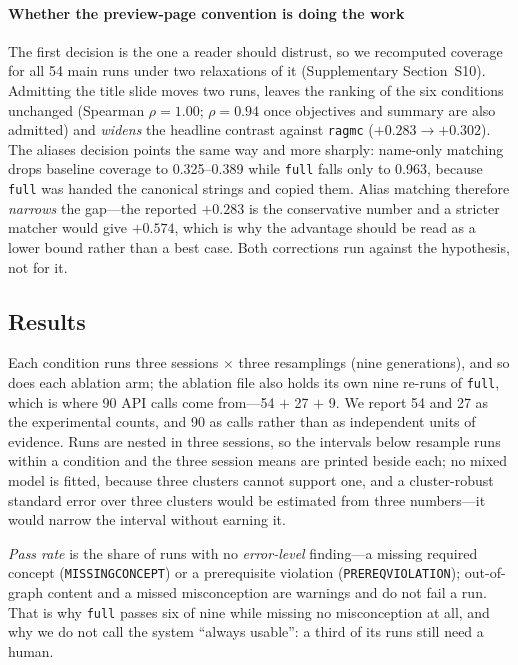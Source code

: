 \documentclass[review,12pt]{elsarticle}
\renewcommand{\_}{\kgunderscore\allowbreak}
\newcommand{\id}[1]{\texttt{#1}}
\begin{document}
\paragraph{Whether the preview-page convention is doing the work}
\label{sec:coverage-sensitivity}
The first decision is the one a reader should distrust, so we recomputed coverage
for all 54 main runs under two relaxations of it (Supplementary
Section~S10). Admitting the title slide moves two runs, leaves the ranking of
the six conditions unchanged (Spearman $\rho=1.00$; $\rho=0.94$ once objectives
and summary are also admitted) and \emph{widens} the headline contrast against
\id{rag\_mc} ($+0.283\to+0.302$). The aliases decision points the same way and
more sharply: name-only matching drops baseline coverage to 0.325--0.389 while
\id{full} falls only to 0.963, because \id{full} was handed the canonical strings
and copied them. Alias matching therefore \emph{narrows} the gap---the reported
$+0.283$ is the conservative number and a stricter matcher would give $+0.574$,
which is why the advantage should be read as a lower bound rather than a best
case. Both corrections run against the hypothesis, not for it.



\subsection{Results}
\label{sec:results}

Each condition runs three sessions $\times$ three resamplings (nine
generations), and so does each ablation arm; the ablation file also holds its own
nine re-runs of \id{full}, which is where 90 API calls come from---54 $+$ 27 $+$
9. We report 54 and 27 as the experimental counts, and 90 as calls rather than as
independent units of evidence. Runs are nested in three sessions, so the
intervals below resample runs within a condition and the three session means are
printed beside each; no mixed model is fitted, because three clusters cannot
support one, and a cluster-robust standard error over three clusters would be
estimated from three numbers---it would narrow the interval without earning it.

\emph{Pass rate} is the share of runs with no \emph{error-level} finding---a
missing required concept (\id{MISSING\_CONCEPT}) or a prerequisite violation
(\id{PREREQ\_VIOLATION}); out-of-graph content and a missed misconception are
warnings and do not fail a run. That is why \id{full} passes six of nine while
missing no misconception at all, and why we do not call the system ``always
usable'': a third of its runs still need a human.
\end{document}
